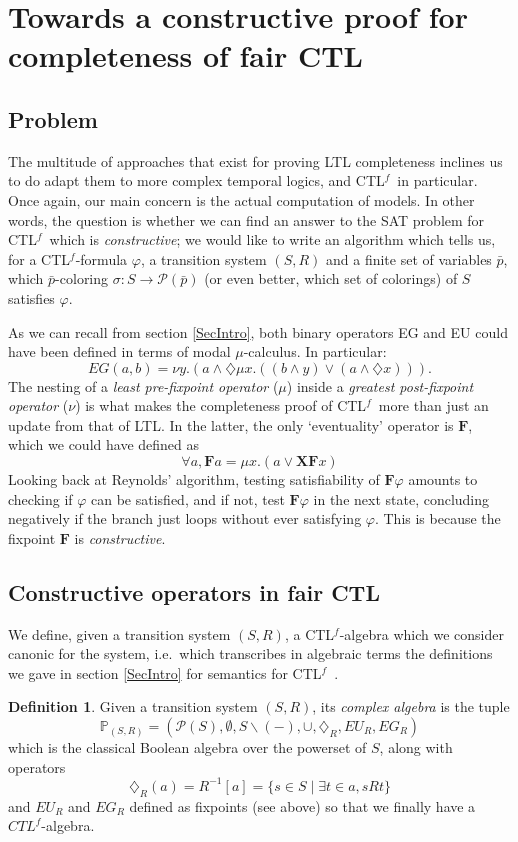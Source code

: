 \documentclass[11pt]{article}
\newcommand{\CTLf}{{CTL$^f$}}
\newcommand{\X}{{\mathbf{X}}}
\newcommand{\F}{{\mathbf{F}}}
\newcommand{\orr}{{\vee}}
\newcommand{\phii}{{\varphi}}
\newcommand{\dia}{{\diamondsuit}}
\theoremstyle{definition}
\newtheorem{definition}{Definition}
\begin{document}
\section{Towards a constructive proof for completeness of fair CTL}\label{SecCTLfcomp}

\subsection*{Problem}
The multitude of approaches that exist for proving LTL completeness inclines us to do adapt them to more complex temporal logics,
and \CTLf~in particular. Once again, our main concern is the actual computation of models. In other words, the question is
whether we can find an answer to the SAT problem for \CTLf~which is \emph{constructive}; we would like to write an algorithm 
which tells us, for a \CTLf-formula $\phii$, a transition system $(S,R)$ and a finite set of variables $\bar{p}$, which $\bar{p}$-coloring 
$\sigma : S \to \mathcal{P}(\bar{p})$ (or even better, which set of colorings) of $S$ satisfies $\phii$.

As we can recall from section \ref*{SecIntro}, both binary operators EG and EU could have been defined in terms of
modal $\mu$-calculus. In particular: \[EG(a,b)=\nu y.(a\wedge\dia\mu x.((b\wedge y)\vee(a\wedge\dia x))).\]
The nesting of a \emph{least pre-fixpoint operator} ($\mu$) inside a \emph{greatest post-fixpoint operator} ($\nu$)
is what makes the completeness proof of \CTLf~more than just an update from that of LTL. In the latter, the only `eventuality' operator is $\F$, which
we could have defined as \[\forall a, \F a = \mu x. (a\orr\X\F x)\] Looking back at Reynolds' algorithm, testing satisfiability
of $\F\phii$ amounts to checking if $\phii$ can be satisfied, and if not, test $\F\phii$ in the next state, concluding negatively if 
the branch just loops without ever satisfying $\phii$. This is because the fixpoint $\F$ is \emph{constructive}.

\subsection*{Constructive operators in fair CTL}

We define, given a transition system $(S,R)$, a \CTLf-algebra which we consider canonic for the system, i.e.~which transcribes in algebraic
terms the definitions we gave in section \ref*{SecIntro} for semantics for \CTLf~\cite[Section 2]{GhivG16}.

\begin{definition}\label{complex_algebra}
    Given a transition system $(S,R)$, its \emph{complex algebra} is the tuple \[\mathbb{P}_{(S,R)}=(\mathcal{P}(S),\emptyset,S\backslash(-),\cup,\dia_R,EU_R,EG_R)\] which is the classical Boolean algebra over the powerset of $S$, along with operators \[\dia_R(a)=R^{-1}[a]=\{s\in S \mid \exists t\in a, sRt \}\] and $EU_R$ and $EG_R$ defined as fixpoints (see above) so that we finally have a $CTL^f$-algebra. 
\end{definition}
\end{document}
